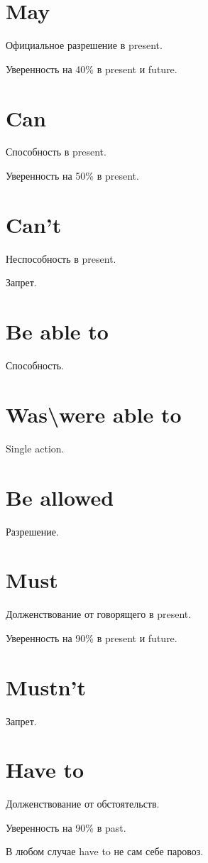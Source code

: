 \documentclass[oneside]{book}
\begin{document}
\section{May}
Официальное разрешение в present.

Уверенность на 40\% в present и future.

\section{Can}
Способность в present.

Уверенность на 50\% в present.

\section{Can't}
Неспособность в present.

Запрет.

\section{Be able to}
Способность.

\section{Was\textbackslash were able to}
Single action.

\section{Be allowed}
Разрешение.

\section{Must}
Долженствование от говорящего в present.

Уверенность на 90\% в present и future.

\section{Mustn't}
Запрет.

\section{Have to}
Долженствование от обстоятельств.

Уверенность на 90\% в past.

В любом случае have to не сам себе паровоз.
\end{document}
